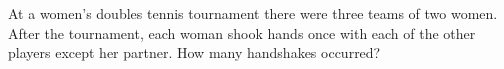 At a women's doubles tennis tournament there were three teams of two women. After the tournament, each woman shook hands once with each of the other players except her partner. How many handshakes occurred?
